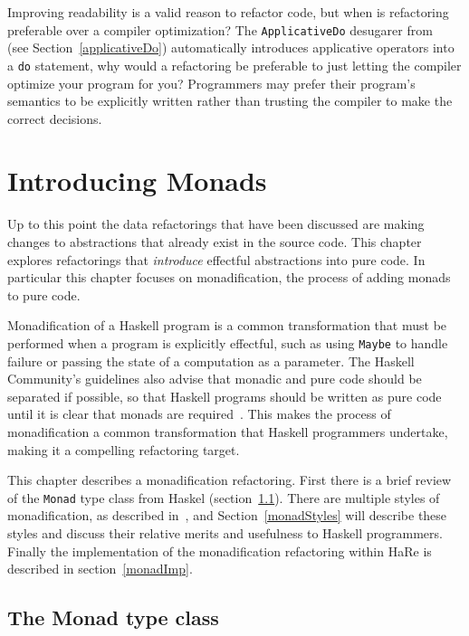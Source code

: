 Improving readability is a valid reason to refactor code, but when is refactoring preferable over a compiler optimization? The \texttt{ApplicativeDo}  desugarer from~\cite{applicativeDo} (see Section~\ref{applicativeDo}) automatically introduces applicative operators into a \texttt{do} statement, why would a refactoring be preferable to just letting the compiler optimize your program for you? Programmers may prefer their program's semantics to be explicitly written rather than trusting the compiler to make the correct decisions.

   

\chapter{Introducing Monads}
\label{chp:monadification}

Up to this point the data refactorings that have been discussed are making changes to abstractions that already exist in the source code. This chapter explores refactorings that \textit{introduce} effectful abstractions into pure code. In particular this chapter focuses on monadification, the process of adding monads to pure code. 

Monadification of a Haskell program is a common transformation that must be performed when a program is explicitly effectful, such as using \texttt{Maybe} to handle failure or passing the state of a computation as a parameter. The Haskell Community's guidelines also advise that monadic and pure code should be separated if possible, so that Haskell programs should be written as pure code until it is clear that monads are required~\citep{guidelines}. This makes the process of monadification a common transformation that Haskell programmers undertake, making it a compelling refactoring target.

This chapter describes a monadification refactoring. First there is a brief review of the \texttt{Monad} type class from Haskel (section~\ref{monTC}). There are multiple styles of monadification, as described in~\citep{monadSurvey}, and Section~\ref{monadStyles} will describe these styles and discuss their relative merits and usefulness to Haskell programmers. Finally the implementation of the monadification refactoring within HaRe is described in section~\ref{monadImp}.
 
\section{The Monad type class}
\label{monTC}

